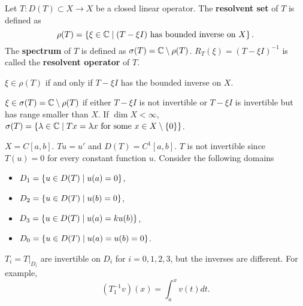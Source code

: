 \begin{definition}
    Let $T:D(T)\subset X\to X$ be a closed linear operator. The 
    \textbf{resolvent set} of $T$ is defined as 
    \begin{equation*}
        \rho(T) = \left\{ \xi\in\mathbb{C} \;\middle\vert\; (T-\xi I) \text{ has bounded inverse on $X$} \right\}.
    \end{equation*}
    The \textbf{spectrum} of $T$ is defined as $\sigma(T) = \mathbb{C}\setminus\rho(T)$. 
    $R_T(\xi) = (T-\xi I)^{-1}$ is called the \textbf{resolvent operator} of $T$.
\end{definition}
\begin{remark}
    $\xi\in\rho(T)$ if and only if $T-\xi I$ has the bounded inverse on $X$.
\end{remark}
\begin{remark}
    $\xi\in\sigma(T) = \mathbb{C}\setminus\rho(T)$ if either $T-\xi I$ is not invertible 
    or $T-\xi I$ is invertible but has range smaller than $X$. If $\dim X<\infty$, 
    $\sigma(T) = \left\{ \lambda\in\mathbb{C} \;\middle\vert\; Tx = \lambda x \text{ for some } x\in X\setminus \left\{ {0} \right\} \right\}$.
\end{remark}

\begin{example}
    $X = C[a,b]$. $Tu = u'$ and $D(T) = C^1[a,b]$. $T$ is not invertible since 
    $T(u) = 0$ for every constant function $u$. Consider the following domains 
    \begin{itemize}
        \item $D_1 = \left\{ u\in D(T) \;\middle\vert\; u(a) = 0 \right\}$, 
        \item $D_2 = \left\{ u\in D(T) \;\middle\vert\; u(b) = 0 \right\}$, 
        \item $D_3 = \left\{ u\in D(T) \;\middle\vert\; u(a) = ku(b) \right\}$, 
        \item $D_0 = \left\{ u\in D(T) \;\middle\vert\; u(a) = u(b) = 0 \right\}$.
    \end{itemize}
    $T_i = T|_{D_i}$ are invertible on $D_i$ for $i = 0,1,2,3$, but the 
    inverses are different. For example, 
    \begin{equation*}
        (T^{-1}_1 v)(x) = \int_a^x v(t)dt.
    \end{equation*}
\end{example}

